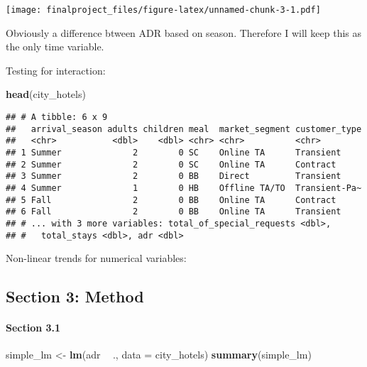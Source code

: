 \documentclass[]{article}
\newenvironment{Shaded}{\begin{snugshade}}{\end{snugshade}}
\newcommand{\DataTypeTok}[1]{\textcolor[rgb]{0.13,0.29,0.53}{#1}}
\newcommand{\KeywordTok}[1]{\textcolor[rgb]{0.13,0.29,0.53}{\textbf{#1}}}
\newcommand{\NormalTok}[1]{#1}
\newcommand{\OperatorTok}[1]{\textcolor[rgb]{0.81,0.36,0.00}{\textbf{#1}}}
\newcommand{\StringTok}[1]{\textcolor[rgb]{0.31,0.60,0.02}{#1}}
\let\oldparagraph\paragraph
\renewcommand{\paragraph}[1]{\oldparagraph{#1}\mbox{}}
\begin{document}
\texttt{[image: finalproject\_files/figure-latex/unnamed-chunk-3-1.pdf]}

Obviously a difference btween ADR based on season. Therefore I will keep
this as the only time variable.

Testing for interaction:

\begin{Shaded}
\begin{Highlighting}[]
\KeywordTok{head}\NormalTok{(city_hotels)}
\end{Highlighting}
\end{Shaded}

\begin{verbatim}
## # A tibble: 6 x 9
##   arrival_season adults children meal  market_segment customer_type
##   <chr>           <dbl>    <dbl> <chr> <chr>          <chr>        
## 1 Summer              2        0 SC    Online TA      Transient    
## 2 Summer              2        0 SC    Online TA      Contract     
## 3 Summer              2        0 BB    Direct         Transient    
## 4 Summer              1        0 HB    Offline TA/TO  Transient-Pa~
## 5 Fall                2        0 BB    Online TA      Contract     
## 6 Fall                2        0 BB    Online TA      Transient    
## # ... with 3 more variables: total_of_special_requests <dbl>,
## #   total_stays <dbl>, adr <dbl>
\end{verbatim}

Non-linear trends for numerical variables:

\hypertarget{section-3-method}{%
\subsection{Section 3: Method}\label{section-3-method}}

\hypertarget{section-3.1}{%
\paragraph{Section 3.1}\label{section-3.1}}

\begin{Shaded}
\begin{Highlighting}[]
\NormalTok{simple_lm <-}\StringTok{ }\KeywordTok{lm}\NormalTok{(adr }\OperatorTok{~}\StringTok{ }\NormalTok{., }\DataTypeTok{data =}\NormalTok{ city_hotels)}
\KeywordTok{summary}\NormalTok{(simple_lm)}
\end{Highlighting}
\end{Shaded}
\end{document}

